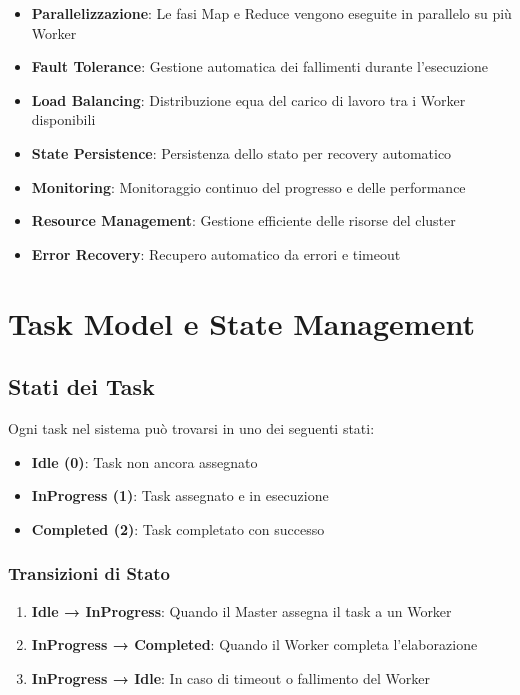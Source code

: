 \documentclass[12pt,a4paper]{article}
\begin{document}
\begin{itemize}
\item \textbf{Parallelizzazione}: Le fasi Map e Reduce vengono eseguite in parallelo su più Worker
\item \textbf{Fault Tolerance}: Gestione automatica dei fallimenti durante l'esecuzione
\item \textbf{Load Balancing}: Distribuzione equa del carico di lavoro tra i Worker disponibili
\item \textbf{State Persistence}: Persistenza dello stato per recovery automatico
\item \textbf{Monitoring}: Monitoraggio continuo del progresso e delle performance
\item \textbf{Resource Management}: Gestione efficiente delle risorse del cluster
\item \textbf{Error Recovery}: Recupero automatico da errori e timeout
\end{itemize}

\section{Task Model e State Management}

\subsection{Stati dei Task}

Ogni task nel sistema può trovarsi in uno dei seguenti stati:

\begin{itemize}
\item \textbf{Idle (0)}: Task non ancora assegnato
\item \textbf{InProgress (1)}: Task assegnato e in esecuzione
\item \textbf{Completed (2)}: Task completato con successo
\end{itemize}

\subsubsection{Transizioni di Stato}

\begin{enumerate}
\item \textbf{Idle → InProgress}: Quando il Master assegna il task a un Worker
\item \textbf{InProgress → Completed}: Quando il Worker completa l'elaborazione
\item \textbf{InProgress → Idle}: In caso di timeout o fallimento del Worker
\end{enumerate}
\end{document}
